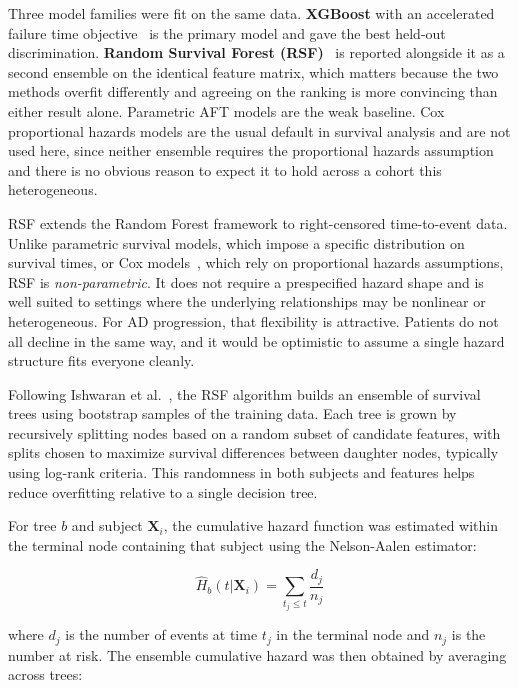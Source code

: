 \documentclass[blue]{ludusofficial}  %
\begin{document}
Three model families were fit on the same data. \textbf{XGBoost} with an accelerated failure time objective~\cite{chen2016xgboost,barnwal2022survivalxgb} is the primary model and gave the best held-out discrimination. \textbf{Random Survival Forest (RSF)}~\cite{ishwaran2008rsf} is reported alongside it as a second ensemble on the identical feature matrix, which matters because the two methods overfit differently and agreeing on the ranking is more convincing than either result alone. Parametric AFT models are the weak baseline. Cox proportional hazards models are the usual default in survival analysis and are not used here, since neither ensemble requires the proportional hazards assumption and there is no obvious reason to expect it to hold across a cohort this heterogeneous.

RSF extends the Random Forest framework to right-censored time-to-event data. Unlike parametric survival models, which impose a specific distribution on survival times, or Cox models~\cite{cox1972}, which rely on proportional hazards assumptions, RSF is \textit{non-parametric}. It does not require a prespecified hazard shape and is well suited to settings where the underlying relationships may be nonlinear or heterogeneous. For AD progression, that flexibility is attractive. Patients do not all decline in the same way, and it would be optimistic to assume a single hazard structure fits everyone cleanly.

Following Ishwaran et al.~\cite{ishwaran2008rsf}, the RSF algorithm builds an ensemble of survival trees using bootstrap samples of the training data. Each tree is grown by recursively splitting nodes based on a random subset of candidate features, with splits chosen to maximize survival differences between daughter nodes, typically using log-rank criteria. This randomness in both subjects and features helps reduce overfitting relative to a single decision tree.

For tree $b$ and subject $\mathbf{X}_i$, the cumulative hazard function was estimated within the terminal node containing that subject using the Nelson-Aalen estimator:

\begin{equation}
    \hat{H}_b(t | \mathbf{X}_i) = \sum_{t_j \leq t} \frac{d_j}{n_j}
\end{equation}

where $d_j$ is the number of events at time $t_j$ in the terminal node and $n_j$ is the number at risk. The ensemble cumulative hazard was then obtained by averaging across trees:
\end{document}
